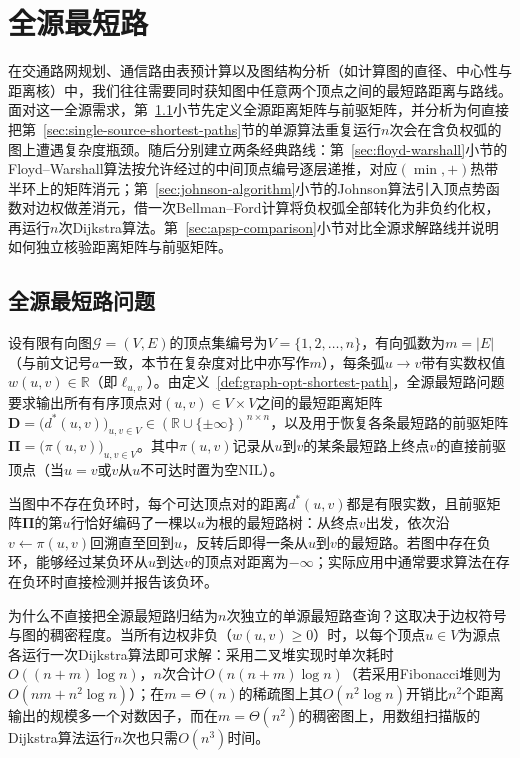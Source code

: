 
\section{全源最短路}
\label{sec:all-pairs-shortest-paths}

在交通路网规划、通信路由表预计算以及图结构分析（如计算图的直径、中心性与距离核）中，我们往往需要同时获知图中任意两个顶点之间的最短路距离与路线。面对这一全源需求，第~\ref{sec:apsp-problem}小节先定义全源距离矩阵与前驱矩阵，并分析为何直接把第~\ref{sec:single-source-shortest-paths}节的单源算法重复运行$n$次会在含负权弧的图上遭遇复杂度瓶颈。随后分别建立两条经典路线：第~\ref{sec:floyd-warshall}小节的Floyd--Warshall算法按允许经过的中间顶点编号逐层递推，对应$(\min,+)$热带半环上的矩阵消元；第~\ref{sec:johnson-algorithm}小节的Johnson算法引入顶点势函数对边权做差消元，借一次Bellman--Ford计算将负权弧全部转化为非负约化权，再运行$n$次Dijkstra算法。第~\ref{sec:apsp-comparison}小节对比全源求解路线并说明如何独立核验距离矩阵与前驱矩阵。

\subsection{全源最短路问题}
\label{sec:apsp-problem}

设有限有向图$\mathcal G=(V,E)$的顶点集编号为$V=\{1,2,\ldots,n\}$，有向弧数为$m=|E|$（与前文记号$a$一致，本节在复杂度对比中亦写作$m$），每条弧$u\to v$带有实数权值$w(u,v)\in\mathbb R$（即$\ell_{u,v}$）。由定义~\ref{def:graph-opt-shortest-path}，全源最短路问题要求输出所有有序顶点对$(u,v)\in V\times V$之间的最短距离矩阵$\bm D=\bigl(d^*(u,v)\bigr)_{u,v\in V}\in(\mathbb R\cup\{\pm\infty\})^{n\times n}$，以及用于恢复各条最短路的前驱矩阵$\bm\Pi=\bigl(\pi(u,v)\bigr)_{u,v\in V}$。其中$\pi(u,v)$记录从$u$到$v$的某条最短路上终点$v$的直接前驱顶点（当$u=v$或$v$从$u$不可达时置为空$\mathrm{NIL}$）。

当图中不存在负环时，每个可达顶点对的距离$d^*(u,v)$都是有限实数，且前驱矩阵$\bm\Pi$的第$u$行恰好编码了一棵以$u$为根的最短路树：从终点$v$出发，依次沿$v\gets\pi(u,v)$回溯直至回到$u$，反转后即得一条从$u$到$v$的最短路。若图中存在负环，能够经过某负环从$u$到达$v$的顶点对距离为$-\infty$；实际应用中通常要求算法在存在负环时直接检测并报告该负环。

为什么不直接把全源最短路归结为$n$次独立的单源最短路查询？这取决于边权符号与图的稠密程度。当所有边权非负（$w(u,v)\geq0$）时，以每个顶点$u\in V$为源点各运行一次Dijkstra算法即可求解：采用二叉堆实现时单次耗时$O((n+m)\log n)$，$n$次合计$O(n(n+m)\log n)$（若采用Fibonacci堆则为$O(nm+n^2\log n)$）；在$m=\Theta(n)$的稀疏图上其$O(n^2\log n)$开销比$n^2$个距离输出的规模多一个对数因子，而在$m=\Theta(n^2)$的稠密图上，用数组扫描版的Dijkstra算法运行$n$次也只需$O(n^3)$时间。

